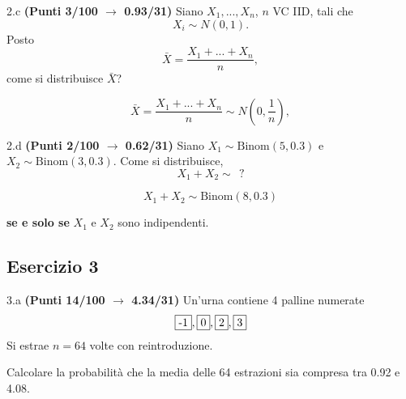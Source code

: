 \documentclass[
  11pt,
]{book}
\theoremstyle{mytheoremstyle}
\theoremstyle{mydefstyle}
\newenvironment{sol}
  {
  \begin{tcolorbox}[enhanced,breakable,arc=0.1mm,boxrule=1pt,colback=white,colframe=iblue,
  title=\bf \fontfamily{lmss}\selectfont \hspace{.5 cm} Soluzione,drop fuzzy shadow]

}{
\end{tcolorbox}
  }
\begin{document}
2.c \textbf{(Punti 3/100 \(\rightarrow\) 0.93/31)} Siano \(X_1,...,X_n\), \(n\) VC IID, tali che
\[
X_i\sim N(0,1).
\]
Posto
\[
\bar X = \frac{X_1+...+X_n}{n},
\]
come si distribuisce \(\bar X\)?

\begin{sol}
\[
\bar X = \frac{X_1+...+X_n}{n}\sim N\left(0,\frac 1n\right),
\]

\end{sol}

2.d \textbf{(Punti 2/100 \(\rightarrow\) 0.62/31)} Siano \(X_1\sim \text{Binom}(5,0.3)\) e \(X_2\sim \text{Binom}(3,0.3)\).
Come si distribuisce,
\[X_1+X_2\sim ~~?\]

\begin{sol}
\[X_1+X_2\sim \text{Binom}(8,0.3)\]

\textbf{se e solo se} \(X_1\) e \(X_2\) sono indipendenti.

\end{sol}

\subsection{Esercizio 3}\label{esercizio-3-7}

3.a \textbf{(Punti 14/100 \(\rightarrow\) 4.34/31)} Un'urna contiene 4 palline numerate
\[\fbox{-1},\fbox{0},\fbox{2},\fbox{3}\]
Si estrae \(n=64\) volte con reintroduzione.

Calcolare la probabilità che la media delle 64 estrazioni sia compresa tra
0.92 e 4.08.
\end{document}
